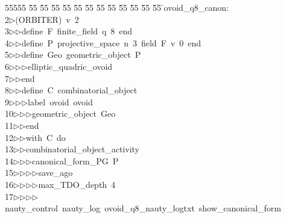 %
%
\begin{tabbing}
55555 \= 55 \= 55 \= 55 \= 55 \= 55 \= 55 \= 55 \= 55 \= 55 \= 55 \= 55 \= 55 \= \>ovoid\_q8\_canon:\\[0pt]
2\>$\triangleright$\>(ORBITER)\ v\ 2\ \\[0pt]
3\>$\triangleright$\>$\triangleright$\>define\ F\ finite\_field\ q\ 8\ end\ \\[0pt]
4\>$\triangleright$\>$\triangleright$\>define\ P\ projective\_space\ n\ 3\ field\ F\ v\ 0\ end\ \\[0pt]
5\>$\triangleright$\>$\triangleright$\>define\ Geo\ geometric\_object\ P\ \\[0pt]
6\>$\triangleright$\>$\triangleright$\>$\triangleright$\>elliptic\_quadric\_ovoid\ \\[0pt]
7\>$\triangleright$\>$\triangleright$\>end\ \\[0pt]
8\>$\triangleright$\>$\triangleright$\>define\ C\ combinatorial\_object\ \\[0pt]
9\>$\triangleright$\>$\triangleright$\>$\triangleright$\>label\ ovoid\ ovoid\ \\[0pt]
10\>$\triangleright$\>$\triangleright$\>$\triangleright$\>geometric\_object\ Geo\ \\[0pt]
11\>$\triangleright$\>$\triangleright$\>end\ \\[0pt]
12\>$\triangleright$\>$\triangleright$\>with\ C\ do\ \\[0pt]
13\>$\triangleright$\>$\triangleright$\>combinatorial\_object\_activity\ \\[0pt]
14\>$\triangleright$\>$\triangleright$\>$\triangleright$\>canonical\_form\_PG\ P\ \\[0pt]
15\>$\triangleright$\>$\triangleright$\>$\triangleright$\>$\triangleright$\>save\_ago\ \\[0pt]
16\>$\triangleright$\>$\triangleright$\>$\triangleright$\>$\triangleright$\>max\_TDO\_depth\ 4\ \\[0pt]
17\>$\triangleright$\>$\triangleright$\>$\triangleright$\>$\triangleright$\>nauty\_control\ nauty\_log\ ovoid\_q8\_nauty\_logtxt\ show\_canonical\_form\ \ \\[0pt]

\end{tabbing}
